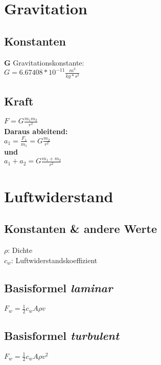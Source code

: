 \documentclass[10pt,a4paper]{article}
\title{\titleText}
\author{\authorText}
\date{\dateText}
\begin{document}
	\begin{multicols}{3}
		\section{Gravitation}
		\subsection{Konstanten}
		\textbf{G} Gravitationskonstante:\\
		\(G=6.67408*10^{-11}\frac{m^3}{kg*s^2} \)
		\subsection{Kraft}
		\(F=G\frac{m_1 m_2}{r^2} \)\\
		\textbf{Daraus ableitend:}\\
		\(a_1 = \frac{F_1}{m_1}=G\frac{m_2}{r^2} \)\\
		\textbf{und}\\
		\(a_1 + a_2 = G\frac{m_1 + m_2}{r^2}\)\\
		\section{Luftwiderstand}
		\subsection{Konstanten \& andere Werte}
		\(\rho\): Dichte\\
		\(c_w\): Luftwiderstandskoeffizient
		\subsection{Basisformel \textit{laminar}}
		\( F_w = \frac{1}{2} c_w A  \rho v \)
		\subsection{Basisformel \textit{turbulent}}
		\( F_w = \frac{1}{2} c_w A  \rho v^2 \)
	\end{multicols}
\end{document}

